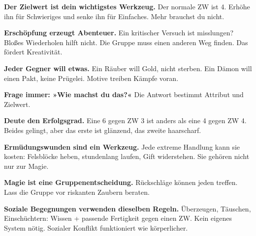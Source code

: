 \documentclass[10pt,a4paper]{article}
\begin{document}
\textbf{Der Zielwert ist dein wichtigstes Werkzeug.} Der normale ZW ist 4. Erhöhe ihn für Schwieriges und senke ihn für Einfaches. Mehr brauchst du nicht.


\textbf{Erschöpfung erzeugt Abenteuer.} Ein kritischer Versuch ist misslungen? Bloßes Wiederholen hilft nicht. Die Gruppe muss einen anderen Weg finden. Das fördert Kreativität.


\textbf{Jeder Gegner will etwas.} Ein Räuber will Gold, nicht sterben. Ein Dämon will einen Pakt, keine Prügelei. Motive treiben Kämpfe voran.


\textbf{Frage immer: »Wie machst du das?«} Die Antwort bestimmt Attribut und Zielwert.


\textbf{Deute den Erfolgsgrad.} Eine 6 gegen ZW 3 ist anders als eine 4 gegen ZW 4. Beides gelingt, aber das erste ist glänzend, das zweite haarscharf.


\textbf{Ermüdungswunden sind ein Werkzeug.} Jede extreme Handlung kann sie kosten: Felsblöcke heben, stundenlang laufen, Gift widerstehen. Sie gehören nicht nur zur Magie.


\textbf{Magie ist eine Gruppenentscheidung.} Rückschläge können jeden treffen. Lass die Gruppe vor riskanten Zaubern beraten.


\textbf{Soziale Begegnungen verwenden dieselben Regeln.} Überzeugen, Täuschen, Einschüchtern: Wissen + passende Fertigkeit gegen einen ZW. Kein eigenes System nötig. Sozialer Konflikt funktioniert wie körperlicher.

\end{document}
